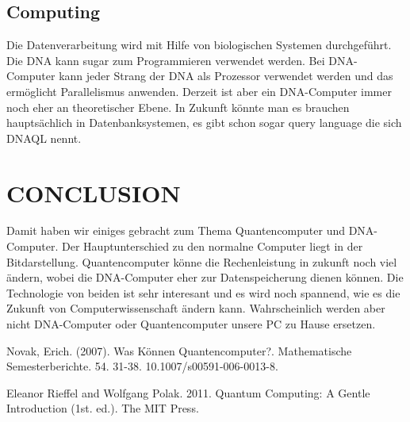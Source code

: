 \documentclass{IEEEcsmag}
\begin{document}
\subsection{Computing}
Die Datenverarbeitung wird mit Hilfe von biologischen Systemen durchgeführt.  Die DNA kann sugar zum Programmieren verwendet werden. Bei DNA-Computer kann jeder Strang der DNA als Prozessor verwendet werden und das ermöglicht Parallelismus anwenden. Derzeit ist aber ein DNA-Computer immer noch eher an theoretischer Ebene. In Zukunft könnte man es brauchen hauptsächlich in Datenbanksystemen, es gibt schon sogar query language die sich DNAQL nennt.






\section{CONCLUSION}
Damit haben wir einiges gebracht zum Thema Quantencomputer und DNA-Computer. Der Hauptunterschied zu den normalne Computer liegt in der Bitdarstellung. Quantencomputer könne die Rechenleistung in zukunft noch viel ändern, wobei die DNA-Computer eher zur Datenspeicherung dienen können. Die Technologie von beiden ist sehr interesant und es wird noch spannend, wie es die Zukunft von Computerwissenschaft ändern kann. Wahrscheinlich werden aber nicht DNA-Computer oder Quantencomputer unsere PC zu Hause ersetzen.


\begin{thebibliography}{1}

Novak, Erich. (2007). Was Können Quantencomputer?. Mathematische Semesterberichte. 54. 31-38. 10.1007/s00591-006-0013-8. 

Eleanor Rieffel and Wolfgang Polak. 2011. Quantum Computing: A Gentle Introduction (1st. ed.). The MIT Press.

\end{thebibliography}
\end{document}
